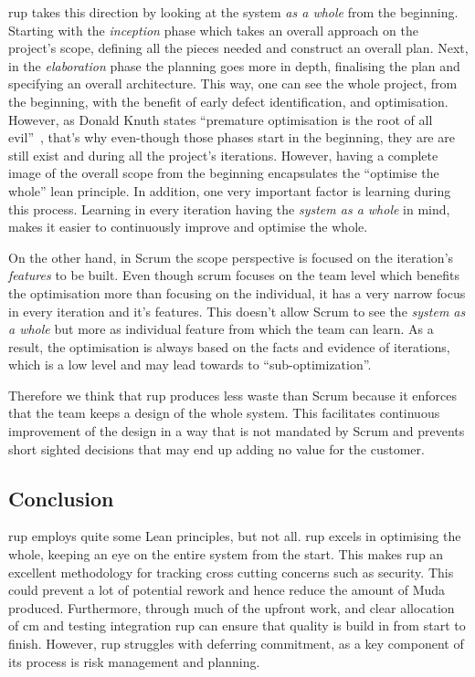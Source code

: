 \ac{rup} takes this direction by looking at the system \textit{as a whole} from the beginning. Starting with the \textit{inception} phase which takes an overall approach on the project's scope, defining all the pieces needed and construct an overall plan. Next, in the \textit{elaboration} phase the planning goes more in depth, finalising the plan and specifying an overall architecture. This way, one can see the whole project, from the beginning, with the benefit of early defect identification, and optimisation. However, as Donald Knuth states ``premature optimisation is the root of all evil''~\citep{knuth1974structured}, that's why even-though  those phases start in the beginning, they are are still exist and during all the project's iterations. However, having a complete image of the overall scope from the beginning encapsulates the ``optimise the whole'' lean principle. In addition, one very important factor is learning during this process. Learning in every iteration having the \textit{system as a whole} in mind, makes it easier to continuously improve and optimise the whole.

On the other hand, in Scrum the scope perspective is focused on the iteration's \textit{features} to be built. Even though scrum focuses on the team level which benefits the optimisation more than focusing on the individual, it has a very narrow focus in every iteration and it's features. This doesn't allow Scrum to see the \textit{system as a whole} but more as individual feature from which the team can learn. As a result, the optimisation is always based on the facts and evidence of iterations, which is a low level and may lead towards to ``sub-optimization''.

Therefore we think that \ac{rup} produces less waste than Scrum because it enforces that the team keeps a design of the whole system. This facilitates continuous improvement of the design in a way that is not mandated by Scrum and prevents short sighted decisions that may end up adding no value for the customer.

\subsection{Conclusion}
\ac{rup} employs quite some Lean principles, but not all. \ac{rup} excels in optimising the whole, keeping an eye on the entire system from the start. This makes \ac{rup} an excellent methodology for tracking cross cutting concerns such as security. This could prevent a lot of potential rework and hence reduce the amount of Muda produced. Furthermore, through much of the upfront work, and clear allocation of \ac{cm} and testing integration \ac{rup} can ensure that quality is build in from start to finish. However, \ac{rup} struggles with deferring commitment, as a key component of its process is risk management and planning.

